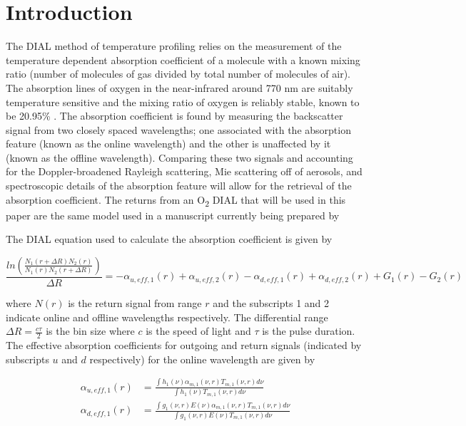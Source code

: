 \documentclass[twoside]{article}
\begin{document}
\section{Introduction}
The DIAL method of temperature profiling relies on the measurement of the temperature dependent absorption coefficient of a molecule with a known mixing ratio (number of molecules of gas divided by total number of molecules of air). 
The absorption lines of oxygen in the near-infrared around 770 nm are suitably temperature sensitive \cite{Bosenberg1998} and the mixing ratio of oxygen is reliably stable, known to be 20.95\% \cite{Jacobson1999}. 
The absorption coefficient is found by measuring the backscatter signal from two closely spaced wavelengths; one associated with the absorption feature (known as the online wavelength) and the other is unaffected by it (known as the offline wavelength). 
Comparing these two signals and accounting for the Doppler-broadened Rayleigh scattering, Mie scattering off of aerosols, and spectroscopic details of the absorption feature will allow for the retrieval of the absorption coefficient. 
The returns from an O\textsubscript{2} DIAL that will be used in this paper are the same model used in a manuscript currently being prepared by \citet{Bunn2018}\\
\par
\noindent The DIAL equation used to calculate the absorption coefficient is given by \cite{Bosenberg1998}

\begin{equation}
	\frac{ln\left(\frac{N_1(r+\Delta R) N_2(r)}{N_1(r) N_2(r+\Delta R)}\right)}{\Delta R} = -\alpha_{u,eff,1}(r) + \alpha_{u,eff,2}(r) -\alpha_{d,eff,1}(r) +\alpha_{d,eff,2}(r) + G_1(r) - G_2(r)
\end{equation}

\noindent where $N(r)$ is the return signal from range $r$ and the subscripts 1 and 2 indicate online and offline wavelengths respectively. 
The differential range $\Delta R = \frac{c \tau}{2}$ is the bin size where $c$ is the speed of light and $\tau$ is the pulse duration. 
The effective absorption coefficients for outgoing and return signals (indicated by subscripts $u$ and $d$ respectively) for the online wavelength are given by

\begin{align}
	\alpha_{u,eff,1}(r) &= \frac{\int h_1(\nu) \alpha_{m,1}(\nu,r) T_{m,1}(\nu,r) d\nu}{\int h_1(\nu) T_{m,1}(\nu,r) d\nu}\\
	\alpha_{d,eff,1}(r) &= \frac{\int g_1(\nu,r) E(\nu) \alpha_{m,1}(\nu,r) T_{m,1}(\nu,r) d\nu}{\int g_1(\nu,r) E(\nu) T_{m,1}(\nu,r) d\nu}
\end{align}
\end{document}
